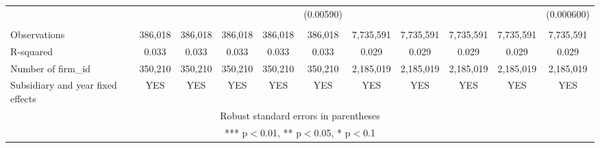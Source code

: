 \begin{tabular}{lcccccccccc}
 &  &  &  &  & (0.00590) &  &  &  &  & (0.000600) \\
 &  &  &  &  &  &  &  &  &  &  \\
Observations & 386,018 & 386,018 & 386,018 & 386,018 & 386,018 & 7,735,591 & 7,735,591 & 7,735,591 & 7,735,591 & 7,735,591 \\
R-squared & 0.033 & 0.033 & 0.033 & 0.033 & 0.033 & 0.029 & 0.029 & 0.029 & 0.029 & 0.029 \\
Number of firm\_id & 350,210 & 350,210 & 350,210 & 350,210 & 350,210 & 2,185,019 & 2,185,019 & 2,185,019 & 2,185,019 & 2,185,019 \\
 Subsidiary and year fixed effects & YES & YES & YES & YES & YES & YES & YES & YES & YES & YES \\ \hline
\multicolumn{11}{c}{ Robust standard errors in parentheses} \\
\multicolumn{11}{c}{ *** p$<$0.01, ** p$<$0.05, * p$<$0.1} \\
\end{tabular}
